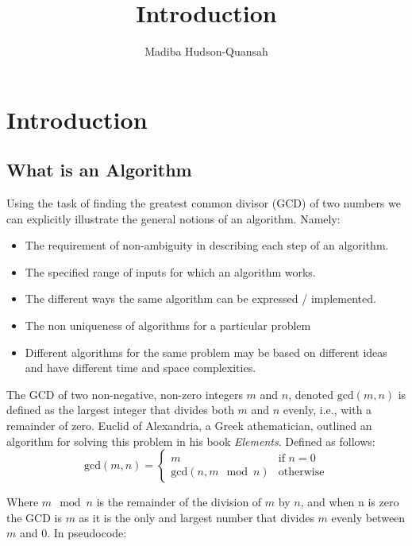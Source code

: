 \documentclass[12pt letter]{report}
\title{\Huge{Introduction}}
\author{\huge{Madiba Hudson-Quansah}}
\date{}
\begin{document}
\maketitle
\newpage
{}
\tableofcontents
\pagebreak

\chapter{Introduction}

\section{What is an Algorithm}


Using the task of finding the greatest common divisor (GCD) of two numbers we can explicitly illustrate the general
notions of an algorithm. Namely:
\begin{itemize}
  \item The requirement of non-ambiguity in describing each step of an algorithm.
  \item  The specified range of inputs for which an algorithm works.
  \item  The different ways the same algorithm can be expressed / implemented.
  \item The non uniqueness of algorithms for a particular problem
  \item Different algorithms for the same problem may be based on different ideas and have different time and space complexities.
\end{itemize}


The GCD of two non-negative, non-zero integers $m$ and $n$, denoted $\text{gcd} \left( m, n \right) $ is defined as the
largest integer that divides both $m$ and $n$ evenly, i.e., with a remainder of zero. Euclid of Alexandria, a Greek
athematician, outlined an algorithm for solving this problem in his book \textit{Elements}. Defined as follows:
\[
  \text{gcd} \left( m, n \right)  = \begin{cases}
    m                                      & \text{if } n = 0 \\
    \text{gcd} \left( n,  m \mod n \right) & \text{otherwise}
  \end{cases}
\]

Where $m \mod n$ is the remainder of the division of $m$ by $n$, and when n is zero the GCD is $m$ as it is the only and
largest number that divides $m$ evenly between  $m$ and $0$. In pseudocode:
\end{document}
